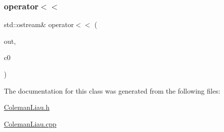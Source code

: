 \subsubsection{\texorpdfstring{operator$<$$<$}{operator<<}}
{\footnotesize\ttfamily std\+::ostream\& operator$<$$<$ (\begin{DoxyParamCaption}\item[{std\+::ostream \&}]{out,  }\item[{const \hyperlink{class_coleman_liau}{Coleman\+Liau} \&}]{c0 }\end{DoxyParamCaption})\hspace{0.3cm}{\ttfamily [friend]}}



The documentation for this class was generated from the following files\+:\begin{DoxyCompactItemize}
\item 
\hyperlink{_coleman_liau_8h}{Coleman\+Liau.\+h}\item 
\hyperlink{_coleman_liau_8cpp}{Coleman\+Liau.\+cpp}\end{DoxyCompactItemize}
